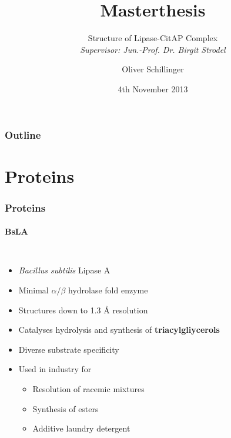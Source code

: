\documentclass[english]{beamer}
\title[Masterthesis]{Masterthesis}
\subtitle[Structure]{Structure of Lipase-CitAP Complex\\
\textit{\small Supervisor: Jun.-Prof. Dr. Birgit Strodel}}
\author{Oliver Schillinger}
\institute{ICS-6 | Multiscale Modelling Group}
\date{4th November 2013}
\begin{document}
\maketitle

\begin{frame}
    \frametitle{Outline}
    \tableofcontents
\end{frame}


\section{Proteins}

\begin{frame}
    \frametitle{Proteins}
    \framesubtitle{BsLA}

    \begin{columns}[t]
        \begin{itemize}
            \item \textit{Bacillus subtilis} Lipase A
            \item Minimal $\alpha/\beta$ hydrolase fold enzyme
            \item Structures down to 1.3 \r{A} resolution
            \item Catalyses hydrolysis and synthesis of \textbf{triacylgliycerols}
            \item Diverse substrate specificity
            \item Used in industry for
                \begin{itemize}
                    \item Resolution of racemic mixtures
                    \item Synthesis of esters
                    \item Additive laundry detergent
                \end{itemize}
        \end{itemize} 


\end{columns}
\end{frame}
\end{document}
